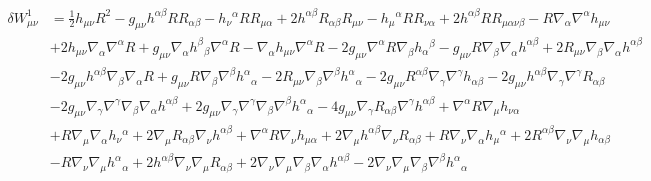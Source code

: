 \documentclass[10pt,letterpaper]{article}
\begin{document}
\begin{align*}
\delta W^1_{\mu\nu} &= \tfrac{1}{2} h_{\mu \nu} R^2 -  g_{\mu \nu} h^{\alpha \beta} R R_{\alpha \beta} -  h_{\nu}{}^{\alpha} R R_{\mu \alpha} + 2 h^{\alpha \beta} R_{\alpha \beta} R_{\mu \nu} -  h_{\mu}{}^{\alpha} R R_{\nu \alpha} + 2 h^{\alpha \beta} R R_{\mu \alpha \nu \beta} -  R \nabla_{\alpha}\nabla^{\alpha}h_{\mu \nu}\\
& + 2 h_{\mu \nu} \nabla_{\alpha}\nabla^{\alpha}R + g_{\mu \nu} \nabla_{\alpha}h^{\beta}{}_{\beta} \nabla^{\alpha}R -  \nabla_{\alpha}h_{\mu \nu} \nabla^{\alpha}R - 2 g_{\mu \nu} \nabla^{\alpha}R \nabla_{\beta}h_{\alpha}{}^{\beta} -  g_{\mu \nu} R \nabla_{\beta}\nabla_{\alpha}h^{\alpha \beta} + 2 R_{\mu \nu} \nabla_{\beta}\nabla_{\alpha}h^{\alpha \beta}\\
& - 2 g_{\mu \nu} h^{\alpha \beta} \nabla_{\beta}\nabla_{\alpha}R + g_{\mu \nu} R \nabla_{\beta}\nabla^{\beta}h^{\alpha}{}_{\alpha} - 2 R_{\mu \nu} \nabla_{\beta}\nabla^{\beta}h^{\alpha}{}_{\alpha} - 2 g_{\mu \nu} R^{\alpha \beta} \nabla_{\gamma}\nabla^{\gamma}h_{\alpha \beta} - 2 g_{\mu \nu} h^{\alpha \beta} \nabla_{\gamma}\nabla^{\gamma}R_{\alpha \beta}\\
& - 2 g_{\mu \nu} \nabla_{\gamma}\nabla^{\gamma}\nabla_{\beta}\nabla_{\alpha}h^{\alpha \beta} + 2 g_{\mu \nu} \nabla_{\gamma}\nabla^{\gamma}\nabla_{\beta}\nabla^{\beta}h^{\alpha}{}_{\alpha} - 4 g_{\mu \nu} \nabla_{\gamma}R_{\alpha \beta} \nabla^{\gamma}h^{\alpha \beta} + \nabla^{\alpha}R \nabla_{\mu}h_{\nu \alpha}\\
& + R \nabla_{\mu}\nabla_{\alpha}h_{\nu}{}^{\alpha} + 2 \nabla_{\mu}R_{\alpha \beta} \nabla_{\nu}h^{\alpha \beta} + \nabla^{\alpha}R \nabla_{\nu}h_{\mu \alpha} + 2 \nabla_{\mu}h^{\alpha \beta} \nabla_{\nu}R_{\alpha \beta} + R \nabla_{\nu}\nabla_{\alpha}h_{\mu}{}^{\alpha} + 2 R^{\alpha \beta} \nabla_{\nu}\nabla_{\mu}h_{\alpha \beta}\\
& -  R \nabla_{\nu}\nabla_{\mu}h^{\alpha}{}_{\alpha} + 2 h^{\alpha \beta} \nabla_{\nu}\nabla_{\mu}R_{\alpha \beta} + 2 \nabla_{\nu}\nabla_{\mu}\nabla_{\beta}\nabla_{\alpha}h^{\alpha \beta} - 2 \nabla_{\nu}\nabla_{\mu}\nabla_{\beta}\nabla^{\beta}h^{\alpha}{}_{\alpha}
\end{align*}
\end{document}
